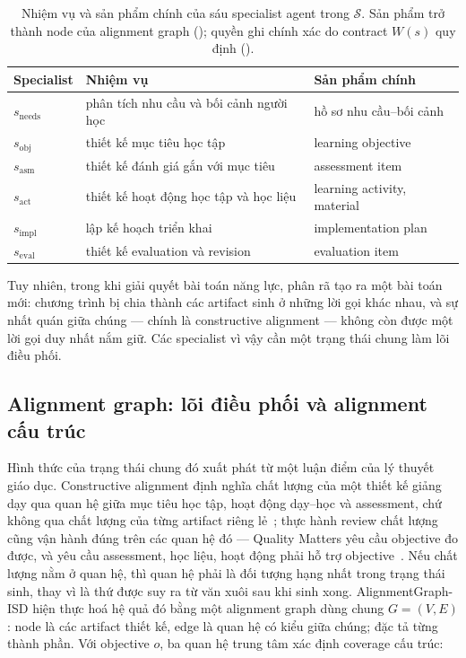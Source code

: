 \begin{table}[t]
  \caption{Nhiệm vụ và sản phẩm chính của sáu specialist agent trong
  $\mathcal{S}$. Sản phẩm trở thành node của alignment graph
  (); quyền ghi chính xác do contract $W(s)$ quy định
  ().}
  \label{tab:specialists}
  \small
  \begin{tabular}{@{}lp{}p{}@{}}
    \toprule
    Specialist & Nhiệm vụ & Sản phẩm chính \\
    \midrule
    $s_{\mathrm{needs}}$ & phân tích nhu cầu và bối cảnh người học &
    hồ sơ nhu cầu--bối cảnh \\
    $s_{\mathrm{obj}}$ & thiết kế mục tiêu học tập & learning objective \\
    $s_{\mathrm{asm}}$ & thiết kế đánh giá gắn với mục tiêu & assessment item \\
    $s_{\mathrm{act}}$ & thiết kế hoạt động học tập và học liệu &
    learning activity, material \\
    $s_{\mathrm{impl}}$ & lập kế hoạch triển khai & implementation plan \\
    $s_{\mathrm{eval}}$ & thiết kế evaluation và revision & evaluation item \\
    \bottomrule
  \end{tabular}
\end{table}

Tuy nhiên, trong khi giải quyết bài toán năng lực, phân rã tạo ra một bài toán mới:
chương trình bị chia thành các artifact sinh ở những lời gọi khác nhau, và sự nhất
quán giữa chúng --- chính là constructive alignment --- không còn được một lời gọi
duy nhất nắm giữ. Các specialist vì vậy cần một trạng thái chung làm lõi điều
phối.

\subsection{Alignment graph: lõi điều phối và alignment cấu trúc}
\label{sec:alignment-graph}

Hình thức của trạng thái chung đó xuất phát từ một luận điểm của lý thuyết giáo
dục. Constructive alignment định nghĩa chất lượng của một thiết kế giảng dạy qua
quan hệ giữa mục tiêu học tập, hoạt động dạy--học và assessment, chứ không qua
chất lượng của từng artifact riêng
lẻ~\cite{biggs1996enhancing,biggs2011teaching}; thực hành review chất lượng cũng
vận hành đúng trên các quan hệ đó --- Quality Matters yêu cầu objective đo được,
và yêu cầu assessment, học liệu, hoạt động phải hỗ trợ
objective~\cite{qm2018rubric}. Nếu chất lượng nằm ở quan hệ, thì quan hệ phải là
đối tượng hạng nhất trong trạng thái sinh, thay vì là thứ được suy ra từ văn xuôi
sau khi sinh xong. AlignmentGraph-ISD hiện thực hoá hệ quả đó bằng một alignment
graph dùng chung $G=(V,E)$: node là các artifact thiết kế, edge là quan hệ có kiểu
giữa chúng;  đặc tả từng thành phần. Với objective $o$, ba
quan hệ trung tâm xác định coverage cấu trúc:


